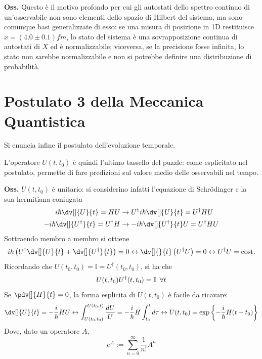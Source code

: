 \textbf{Oss.} Questo è il motivo profondo per cui gli autostati dello spettro continuo di un'osservabile
non sono elementi dello spazio di Hilbert del sistema, ma sono comunque basi generalizzate di esso:
se una misura di posizione in 1D restituisce $x=(4.0\pm0.1)fm$, lo stato del sistema è una sovrapposizione
continua di autostati di $X$ ed è normalizzabile; viceversa, se la precisione fosse infinita, lo stato non
sarebbe normalizzabile e non si potrebbe definire una distribuzione di probabilità.
\section{Postulato 3 della Meccanica Quantistica}
Si enuncia infine il postulato dell'evoluzione temporale.

\noindent{}

L'operatore $U(t,t_0)$ è quindi l'ultimo tassello del puzzle: come esplicitato nel postulato, permette
di fare predizioni sul valore medio delle osservabili nel tempo.

\textbf{Oss.} $U(t,t_0)$ è unitario: si considerino infatti l'equazione di Schrödinger e la sua hermitiana
coniugata
\begin{align*}
    i\hbar\dv[]{U}{t} = HU &\rightarrow U^{\dagger}i\hbar\dv[]{U}{t} = U^{\dagger}HU\\
    -i\hbar\dv[]{U^{\dagger}}{t} = U^{\dagger}H &\rightarrow -i\hbar\dv[]{U^{\dagger}}{t}U = U^{\dagger}HU
\end{align*}
Sottraendo membro a membro si ottiene
$$ i\hbar\left(U^{\dagger}\dv[]{U}{t}+\dv[]{U^{\dagger}}{t}\right) = 0 \leftrightarrow
\dv[]{}{t}\left(U^{\dagger}U\right) = 0 \leftrightarrow U^{\dagger}U=\text{cost.}$$
Ricordando che $U(t_0,t_0) = \mathbb{I} = U^{\dagger}(t_0,t_0)$, si ha che
$$ U(t,t_0)U^{\dagger}(t,t_0)=\mathbb{I}\mkern9mu \forall t$$
Se $\pdv[]{H}{t}=0$, la forma esplicita di $U(t,t_0)$ è facile da ricavare:
$$\dv[]{U}{t} = -\frac{i}{\hbar}HU \leftrightarrow \int_{U(t_0,t_0)}^{U(t_0,t)}\frac{dU}{U} =
-\frac{i}{\hbar}H\int_{t_0}^{t}d\tau \leftrightarrow U(t,t_0)=\exp\left\{-\frac{i}{\hbar}H(t-t_0)\right\}$$
Dove, dato un operatore $A$,
$$e^A:=\sum_{n=0}^{\infty}\frac{1}{n!}A^n$$

